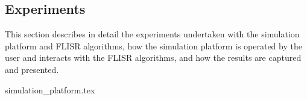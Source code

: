 \subsection{Experiments}
\label{sec:experiments}

This section describes in detail the experiments undertaken with the simulation platform and FLISR algorithms, how the simulation platform is operated by the user and
interacts with the FLISR algorithms, and how the results are captured and presented.

{simulation_platform.tex}

